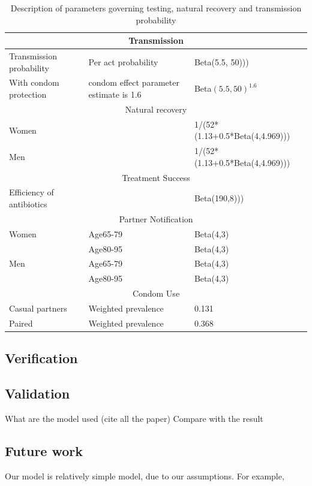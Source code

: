 \documentclass{article}
\begin{document}
\begin{normalsize}
\begin{table}[H]
\begin{tabular}{ |p{5cm}|p{7cm}|p{5cm}| }
		\multicolumn{3}{|c|}{Transmission} \\
		\hline
		Transmission probability & Per act probability & Beta(5.5, 50)))\\
		With condom protection & condom effect parameter estimate is 1.6 & Beta$(5.5,50)^{1.6}$\\
		\hline
		
		\multicolumn{3}{|c|}{Natural recovery} \\
		\hline
		Women & & 1/(52*(1.13+0.5*Beta(4,4.969)))\\
		Men & & 1/(52*(1.13+0.5*Beta(4,4.969)))\\
		
		\hline
		
		\multicolumn{3}{|c|}{Treatment Success} \\
		\hline
		Efficiency of antibiotics & & Beta(190,8)))\\
		\hline
		
		\multicolumn{3}{|c|}{Partner Notification} \\
		\hline
		Women&Age65-79&Beta(4,3)\\
		&Age80-95&Beta(4,3)
		\\
		Men&Age65-79&Beta(4,3)\\
		&Age80-95&Beta(4,3)\\
		\hline
		\multicolumn{3}{|c|}{Condom Use} \\
		\hline
		Casual partners&Weighted prevalence & 0.131\\
		Paired & Weighted prevalence & 0.368
		\\
		\hline
			
		
	\end{tabular}

	\caption{Description of parameters governing testing, natural recovery and transmission probability}
	\label{tab:parameter3}
\end{table}

\subsection{Verification}

\subsection{Validation}
What are the model used (cite all the paper)
Compare with the result

\subsection{Future work}
Our model is relatively simple model, due to our assumptions. For example, 


\end{normalsize}
\end{document}

